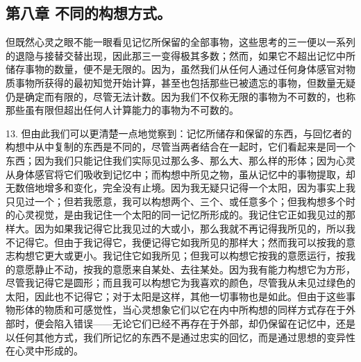 
\subsection{第八章 不同的构想方式。}

但既然心灵之眼不能一眼看见记忆所保留的全部事物，这些思考的三一便以一系列的退隐与接替交替出现，因此那三一变得极其多数；然而，如果它不超出记忆中所储存事物的数量，便不是无限的。因为，虽然我们从任何人通过任何身体感官对物质事物所获得的最初知觉开始计算，甚至也包括那些已被遗忘的事物，但数量无疑仍是确定而有限的，尽管无法计数。因为我们不仅称无限的事物为不可数的，也称那些虽有限但超出任何人计算能力的事物为不可数的。\par

13. 但由此我们可以更清楚一点地觉察到：记忆所储存和保留的东西，与回忆者的构想中从中复制的东西是不同的，尽管当两者结合在一起时，它们看起来是同一个东西；因为我们只能记住我们实际见过那么多、那么大、那么样的形体；因为心灵从身体感官将它们吸收到记忆中；而构想中所见之物，虽从记忆中的事物提取，却无数倍地增多和变化，完全没有止境。因为我无疑只记得一个太阳，因为事实上我只见过一个；但若我愿意，我可以构想两个、三个、或任意多个；但我构想多个时的心灵视觉，是由我记住一个太阳的同一记忆所形成的。我记住它正如我见过的那样大。因为如果我记得它比我见过的大或小，那么我就不再记得我所见的，所以我不记得它。但由于我记得它，我便记得它如我所见的那样大；然而我可以按我的意志构想它更大或更小。我记住它如我所见；但我可以构想它按我的意愿运行，按我的意愿静止不动，按我的意愿来自某处、去往某处。因为我有能力构想它为方形，尽管我记得它是圆形；而且我可以构想它为我喜欢的颜色，尽管我从未见过绿色的太阳，因此也不记得它；对于太阳是这样，其他一切事物也是如此。但由于这些事物形体的物质和可感觉性，当心灵想象它们以它在内中所构想的同样方式存在于外部时，便会陷入错误——无论它们已经不再存在于外部，却仍保留在记忆中，还是以任何其他方式，我们所记忆的东西不是通过忠实的回忆，而是通过思想的变异性在心灵中形成的。\par

